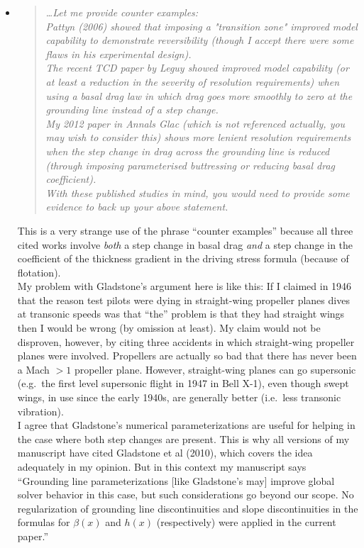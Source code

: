 \documentclass[11pt,reqno]{amsart}
\newcommand{\reply}[2]{
\medskip\medskip
\item  \begin{quote}
\emph{#1}
\end{quote}

\medskip
\noindent #2}
\begin{document}
\begin{itemize}
\reply{\dots Let me provide counter examples: \medskip \\
Pattyn (2006) showed that imposing a "transition zone" improved model capability to demonstrate reversibility (though I accept there were some flaws in his experimental design). \medskip \\
The recent TCD paper by Leguy showed improved model capability (or at least a reduction in the severity of resolution requirements) when using a basal drag law in which drag goes more smoothly to zero at the grounding line instead of a step change. \medskip \\
My 2012 paper in Annals Glac (which is not referenced actually, you may wish to consider this) shows more lenient resolution requirements when the step change in drag across the grounding line is reduced (through imposing parameterised buttressing or reducing basal drag coefficient). \medskip \\
With these published studies in mind, you would need to provide some evidence to back up your above statement.}{This is a very strange use of the phrase ``counter examples'' because all three cited works involve \emph{both} a step change in basal drag \emph{and} a step change in the coefficient of the thickness gradient in the driving stress formula (because of flotation).\medskip \\
My problem with Gladstone's argument here is like this: If I claimed in 1946 that the reason test pilots were dying in straight-wing propeller planes dives at transonic speeds was that ``the'' problem is that they had straight wings then I would be wrong (by omission at least).  My claim would not be disproven, however, by citing three accidents in which straight-wing propeller planes were involved.  Propellers are actually so bad that there has never been a Mach $>1$ propeller plane.   However, straight-wing planes can go supersonic (e.g.~the first level supersonic flight in 1947 in Bell X-1), even though swept wings, in use since the early 1940s, are generally better (i.e.~less transonic vibration).  \medskip \\
I agree that Gladstone's numerical parameterizations are useful for helping in the case where both step changes are present.  This is why all versions of my manuscript have cited Gladstone et al (2010), which covers the idea adequately in my opinion.  But in this context my manuscript says ``Grounding line parameterizations [like Gladstone's may] improve global solver behavior in this case, but such considerations go beyond our scope.  No regularization of grounding line discontinuities and slope discontinuities in the formulas for $\beta(x)$ and $h(x)$ (respectively) were applied in the current paper.'' \medskip \\
}
\end{itemize}
\end{document}
